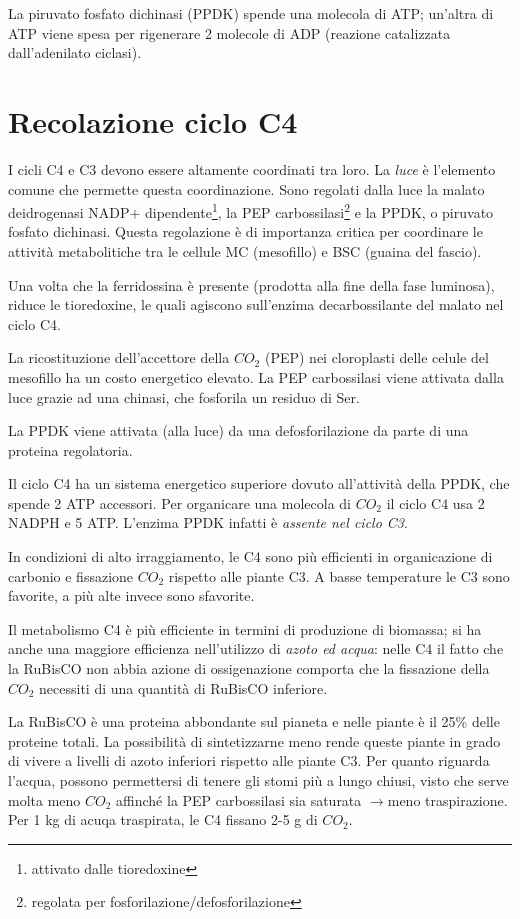 \documentclass[a4paper,12pt]{book}
\newcommand{\lfreccia}{\ensuremath{\longrightarrow}}
\begin{document}
La piruvato fosfato dichinasi (PPDK) spende una molecola di ATP; un'altra di ATP viene spesa per rigenerare 2 molecole di ADP (reazione catalizzata dall'adenilato ciclasi).

\section{Recolazione ciclo C4}
I cicli C4 e C3 devono essere altamente coordinati tra loro. La \emph{luce} è l'elemento comune che permette questa coordinazione. Sono regolati dalla luce la malato deidrogenasi NADP+ dipendente\footnote{attivato dalle tioredoxine}, la PEP carbossilasi\footnote{regolata per fosforilazione/defosforilazione} e la PPDK, o piruvato fosfato dichinasi.
Questa regolazione è di importanza critica per coordinare le attività metabolitiche tra le cellule
MC (mesofillo) e BSC (guaina del fascio).

Una volta che la ferridossina è presente (prodotta alla fine della fase luminosa), riduce le tioredoxine, le quali agiscono sull'enzima decarbossilante del malato nel ciclo C4.

La ricostituzione dell’accettore della $CO_{2}$ (PEP) nei cloroplasti delle celule del mesofillo
ha un costo energetico elevato.
La PEP carbossilasi viene attivata dalla luce grazie ad una chinasi, che fosforila un residuo di Ser.

La PPDK viene attivata (alla luce) da una defosforilazione da parte di una proteina regolatoria.

Il ciclo C4 ha un sistema energetico superiore dovuto all'attività della PPDK, che spende 2 ATP accessori. Per organicare una molecola di $CO_{2}$ il ciclo C4 usa 2 NADPH e 5 ATP. L'enzima PPDK infatti è \emph{assente nel ciclo C3}.

In condizioni di alto irraggiamento, le C4 sono più efficienti in organicazione di carbonio e fissazione $CO_{2}$ rispetto alle piante C3. A basse temperature le C3 sono favorite, a più alte invece sono sfavorite. 

Il metabolismo C4 è più efficiente in termini di produzione di biomassa; si ha anche una maggiore efficienza nell'utilizzo di \emph{azoto ed acqua}: nelle C4 il fatto che la RuBisCO non abbia azione di ossigenazione comporta che la fissazione della $CO_{2}$ necessiti di una quantità di RuBisCO inferiore. 

La RuBisCO è una proteina abbondante sul pianeta e nelle piante è il 25\% delle proteine totali. La possibilità di sintetizzarne meno rende queste piante in grado di vivere a livelli di azoto inferiori rispetto alle piante C3. Per quanto riguarda l'acqua, possono permettersi di tenere gli stomi più a lungo chiusi, visto che serve molta meno $CO_{2}$ affinché la PEP carbossilasi sia saturata \lfreccia meno traspirazione. Per 1 kg di acuqa traspirata, le C4 fissano 2-5 g di $CO_{2}$.
\end{document}
